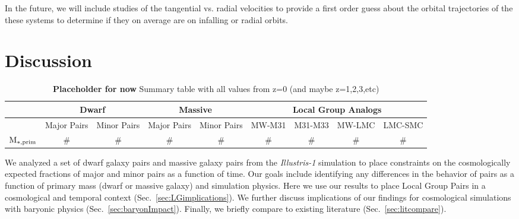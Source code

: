 \documentclass[twocolumn]{aastex63}
\newcommand{\kc}[1]{\textcolor{mypink}{\textbf{#1}} }
\begin{document}
In the future, we will include studies of the tangential vs. radial velocities to provide a first order guess about the orbital trajectories of the these systems to determine if they on average are on infalling or radial orbits. 






\section{Discussion}\label{sec:discussion}
\begin{table*}[tb]
  \begin{center}
\begin{tabular}{ccccc|cccc}
& \multicolumn{2}{c}{Dwarf} & \multicolumn{2}{c}{Massive} & \multicolumn{4}{c}{Local Group Analogs} \\\hline\hline
    & Major Pairs & Minor Pairs & Major Pairs & Minor Pairs & MW-M31 & M31-M33 & MW-LMC& LMC-SMC\\\hline\hline
$\rm M_{*,prim}$ & \# & \# &\# &\#&\#&\#&\#&\#\\
\end{tabular}
\end{center}
\caption{\label{table:summary}\kc{Placeholder for now} Summary table with all values from z=0 (and maybe z=1,2,3,etc)}
\end{table*}

We analyzed a set of dwarf galaxy pairs and massive galaxy pairs from the \textit{Illustris-1} simulation to place constraints on the cosmologically expected fractions of major and minor pairs as a function of time. Our goals include identifying any differences in the behavior of pairs as a function of primary mass (dwarf or massive galaxy) and simulation physics. Here we use our results to place Local Group Pairs in a cosmological and temporal context (Sec.~\ref{sec:LGimplications}). We further discuss implications of our findings for cosmological simulations with baryonic physics (Sec.~\ref{sec:baryonImpact}). Finally, we briefly compare to existing literature (Sec.~\ref{sec:litcompare}).%
\end{document}
